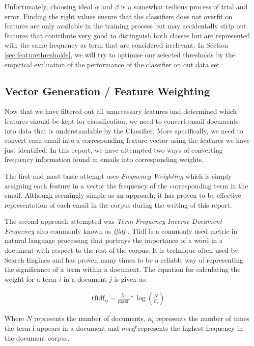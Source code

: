 Unfortunately, choosing ideal \(\alpha \) and \(\beta\) is a somewhat tedious process of trial and error.
Finding the right values ensure that the classifiers does not overfit on features are only available in the training process but may accidentally strip out features that contribute very good to distinguish both classes but are represented with the same frequency as term that are considered irrelevant.
In Section \ref{sec:featurethresholds}, we will try to optimise our selected thresholds by the empirical evaluation of the performance of the classifier on out data set.

\subsection{Vector Generation / Feature Weighting}

Now that we have filtered out all unnecessary features and determined which features should be kept for classification, we need to convert email documents into data that is understandable by the Classifier. More specifically, we need to convert each email into a corresponding feature vector using the features we have just identified. In this report, we have attempted two ways of converting frequency information found in emails into corresponding weights. 

The first and most basic attempt uses \emph{Frequency Weighting} which is simply assigning each feature in a vector the frequency of the corresponding term in the email. Although seemingly simple as an approach, it has proven to be effective representation of each email in the corpus during the writing of this report.

The second approach attempted was \emph{Term Frequency Inverse Document Frequency} also commonly known as \emph{tfidf} \cite{tfidf1973}. Tfidf is a commonly used metric in natural language processing that portrays the importance of a word in a document with respect to the rest of the corpus. It is technique often used by Search Engines and has proven many times to be a reliable way of representing the significance of a term within a document. The equation for calculating the weight for a term $i$ in a document $j$ is given as:

\begin{align*}
	\textrm{tfidf}_{ij} = \frac{f_{ij}}{\textrm{maxf}} * \log\left(\frac{N}{n_i}\right)
\end{align*}

Where $N$ represents the number of documents, $n_i$ represents the number of times the term i appears in a document and \emph{maxf} represents the highest frequency in the document corpus.

